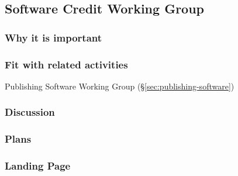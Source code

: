 \subsection{Software Credit Working Group}
\label{sec:software-credit}

\subsubsection{Why it is important}

\subsubsection{Fit with related activities}

Publishing Software Working Group (\S\ref{sec:publishing-software})

\subsubsection{Discussion}

\subsubsection{Plans}

\subsubsection{Landing Page}

